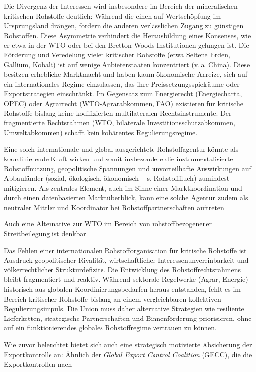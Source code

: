 \documentclass[12pt,a4paper,oneside]{book} %
\begin{document}
{Die Divergenz der Interessen wird insbesondere im Bereich der mineralischen kritischen Rohstoffe deutlich: Während die einen auf Wertschöpfung im Ursprungsland drängen, fordern die anderen verlässlichen Zugang zu günstigen Rohstoffen. Diese Asymmetrie verhindert die Herausbildung eines Konsenses, wie er etwa in der WTO oder bei den Bretton-Woods-Institutionen gelungen ist. Die Förderung und Veredelung vieler kritischer Rohstoffe (etwa Seltene Erden, Gallium, Kobalt) ist auf wenige Anbieterstaaten konzentriert (v. a. China). Diese besitzen erhebliche Marktmacht und haben kaum ökonomische Anreize, sich auf ein internationales Regime einzulassen, das ihre Preissetzungsspielräume oder Exportstrategien einschränkt. Im Gegensatz zum Energierecht (Energiecharta, OPEC) oder Agrarrecht (WTO-Agrarabkommen, FAO) existieren für kritische Rohstoffe bislang keine kodifizierten multilateralen Rechtsinstrumente. Der fragmentierte Rechtsrahmen (WTO, bilaterale Investitionsschutzabkommen, Umweltabkommen) schafft kein kohärentes Regulierungsregime.

Eine solch internationale und global ausgerichtete Rohstoffagentur könnte als koordinierende Kraft wirken und somit insbesondere die instrumentalisierte Rohstoffnutzung, geopolitische Spannungen und unvorteilhafte Auswirkungen auf Abbauländer (sozial, ökologisch, ökonomisch -- s. Rohstofffluch) zumindest mitigieren. Als zentrales Element, auch im Sinne einer Marktkoordination und durch einen datenbasierten Marktüberblick, kann eine solche Agentur zudem als neutraler Mittler und Koordinator bei Rohstoffpartnerschaften auftreten

Auch eine Alternative zur WTO im Bereich von rohstoffbezogenener Streitbeilegung ist denkbar

Das Fehlen einer internationalen Rohstofforganisation für kritische Rohstoffe ist Ausdruck geopolitischer Rivalität, wirtschaftlicher Interessenunvereinbarkeit und völkerrechtlicher Strukturdefizite. Die Entwicklung des Rohstoffrechtsrahmens bleibt fragmentiert und reaktiv. Während sektorale Regelwerke (Agrar, Energie) historisch aus globalen Koordinierungsbedarfen heraus entstanden, fehlt es im Bereich kritischer Rohstoffe bislang an einem vergleichbaren kollektiven Regulierungsimpuls. Die Union muss daher alternative Strategien wie resiliente Lieferketten, strategische Partnerschaften und Binnenförderung priorisieren, ohne auf ein funktionierendes globales Rohstoffregime vertrauen zu können.

Wie zuvor beleuchtet bietet sich auch eine strategisch motivierte Absicherung der Exportkontrolle an: Ähnlich der \textit{Global Export Control Coalition} (GECC), die die Exportkontrollen nach 

}
\end{document}
